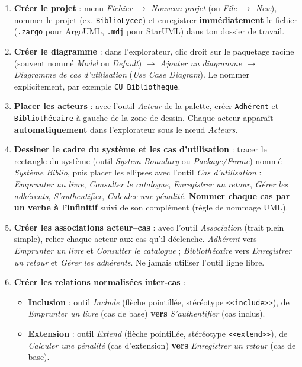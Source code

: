 \documentclass[11pt]{article}
\begin{document}
\begin{methode}
\begin{enumerate}
\item \textbf{Créer le projet} : menu \emph{Fichier $\rightarrow$ Nouveau projet} (ou \emph{File $\rightarrow$ New}), nommer le projet (ex. \texttt{BiblioLycee}) et enregistrer \textbf{immédiatement} le fichier (\texttt{.zargo} pour ArgoUML, \texttt{.mdj} pour StarUML) dans ton dossier de travail.
\item \textbf{Créer le diagramme} : dans l'explorateur, clic droit sur le paquetage racine (souvent nommé \emph{Model} ou \emph{Default}) $\rightarrow$ \emph{Ajouter un diagramme $\rightarrow$ Diagramme de cas d'utilisation} (\emph{Use Case Diagram}). Le nommer explicitement, par exemple \texttt{CU\_Bibliotheque}.
\item \textbf{Placer les acteurs} : avec l'outil \emph{Acteur} de la palette, créer \texttt{Adhérent} et \texttt{Bibliothécaire} à gauche de la zone de dessin. Chaque acteur apparaît \textbf{automatiquement} dans l'explorateur sous le nœud \emph{Acteurs}.
\item \textbf{Dessiner le cadre du système et les cas d'utilisation} : tracer le rectangle du système (outil \emph{System Boundary} ou \emph{Package/Frame}) nommé \emph{Système Biblio}, puis placer les ellipses avec l'outil \emph{Cas d'utilisation} : \emph{Emprunter un livre}, \emph{Consulter le catalogue}, \emph{Enregistrer un retour}, \emph{Gérer les adhérents}, \emph{S'authentifier}, \emph{Calculer une pénalité}. \textbf{Nommer chaque cas par un verbe à l'infinitif} suivi de son complément (règle de nommage UML).
\item \textbf{Créer les associations acteur--cas} : avec l'outil \emph{Association} (trait plein simple), relier chaque acteur aux cas qu'il déclenche. \emph{Adhérent} vers \emph{Emprunter un livre} et \emph{Consulter le catalogue} ; \emph{Bibliothécaire} vers \emph{Enregistrer un retour} et \emph{Gérer les adhérents}. Ne jamais utiliser l'outil ligne libre.
\item \textbf{Créer les relations normalisées inter-cas} : 
      \begin{itemize}
      \item \textbf{Inclusion} : outil \emph{Include} (flèche pointillée, stéréotype \texttt{<<include>>}), de \emph{Emprunter un livre} (cas de base) \textbf{vers} \emph{S'authentifier} (cas inclus).
      \item \textbf{Extension} : outil \emph{Extend} (flèche pointillée, stéréotype \texttt{<<extend>>}), de \emph{Calculer une pénalité} (cas d'extension) \textbf{vers} \emph{Enregistrer un retour} (cas de base).

\end{itemize}
\end{enumerate}
\end{methode}
\end{document}
